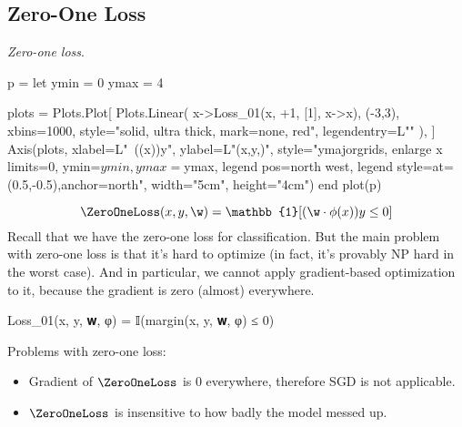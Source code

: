 \subsection{Zero-One Loss} %
\label{sub:zero_one_loss}
\begin{marginfigure}
  \caption{
    \label{fig:zero_one_loss_2} \textit{Zero-one loss}.
  }
  \begin{jlcode}
  p = let
      ymin = 0
      ymax = 4

      plots = Plots.Plot[
          Plots.Linear(
              x->Loss_01(x, +1, [1], x->x), (-3,3), xbins=1000, style="solid, ultra thick, mark=none, red", legendentry=L"\ZeroOneLoss"
          ),
      ]
      Axis(plots,
           xlabel=L"~(\cdot\phi(x))y",
           ylabel=L"\ZeroOneLoss(x,y,)",
           style="ymajorgrids, enlarge x limits=0, ymin=$ymin, ymax=$ymax, legend pos=north west, legend style={at={(0.5,-0.5)},anchor=north}",
           width="5cm", height="4cm")
  end
  plot(p)
  \end{jlcode}
  \begin{center}
  \end{center}
\end{marginfigure}
\begin{equation*}
    \ZeroOneLoss(x, y, \w) = \mathbb{1}[(\w \cdot \phi(x)) y \le 0]
\end{equation*}
Recall that we have the zero-one loss for classification.
But the main problem with zero-one loss is that it's hard to optimize (in fact, it's provably NP hard in the worst case).
And in particular, we cannot apply gradient-based optimization to it,
because the gradient is zero (almost) everywhere.
\begin{algorithm}
\begin{juliaverbatim}
Loss_01(x, y, 𝐰, φ) = 𝕀(margin(x, y, 𝐰, φ) ≤ 0)
\end{juliaverbatim}

\end{algorithm}
%

\noindent Problems with zero-one loss:
\begin{itemize}
    \item Gradient of $\ZeroOneLoss$ is $0$ everywhere, therefore SGD is not applicable.
    \item $\ZeroOneLoss$ is insensitive to how badly the model messed up.
\end{itemize}


